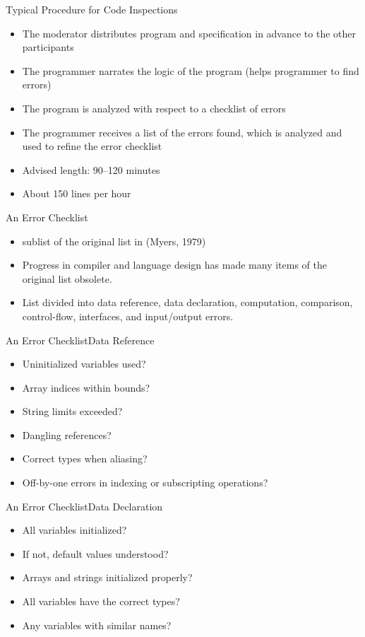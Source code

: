 \begin{Frame}{Typical Procedure for Code Inspections}
  \begin{itemize}
    \item The moderator distributes program and specification in advance
    to the other participants
    \item The programmer narrates the logic of the program (helps programmer to find errors)
    \item The program is analyzed with respect to a checklist of errors
    \item The programmer receives a list of the errors found, which is analyzed
    and used to refine the error checklist
    \item Advised length: 90--120 minutes
    \item About 150 lines per hour
  \end{itemize}
\end{Frame}

\begin{Frame}{An Error Checklist}
  \begin{itemize}
    \item sublist of the original list in (Myers, 1979)
    \item Progress in compiler and language design has made many items
    of the original list obsolete.
    \item List divided into \alert{data reference}, \alert{data declaration},
    \alert{computation}, \alert{comparison}, \alert{control-flow},
    \alert{interfaces}, and \alert{input/output} errors.
  \end{itemize}
\end{Frame}

\begin{Frame}{An Error Checklist}{Data Reference}
  \begin{itemize}
    \item Uninitialized variables used?
    \item Array indices within bounds?
    \item String limits exceeded?
    \item Dangling references?
    \item Correct types when aliasing?
    \item Off-by-one errors in indexing or subscripting operations?
  \end{itemize}
\end{Frame}

\begin{Frame}{An Error Checklist}{Data Declaration}
  \begin{itemize}
    \item All variables initialized?
    \item If not, default values understood?
    \item Arrays and strings initialized properly?
    \item All variables have the correct types?
    \item Any variables with similar names?
  \end{itemize}
\end{Frame}

